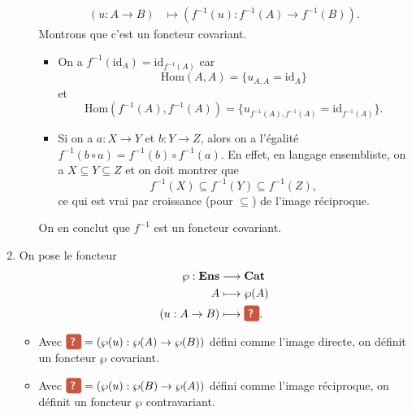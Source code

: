 \documentclass{../../td}
\begin{document}
\begin{enumerate}
\begin{itemize}
\begin{align*}
            (u: A \to B) &\longmapsto (f^{-1}(u) : f^{-1}(A) \to f^{-1}(B))
          .\end{align*}
          Montrons que c'est un foncteur covariant.
          \begin{itemize}
            \item On a $f^{-1}(\mathrm{id}_A) = \mathrm{id}_{f^{-1}(A)}$ car \[
                \mathrm{Hom}(A,A) = \{u_{A,A}=\mathrm{id}_A\}
              \]
              et
              \[
                \mathrm{Hom}(f^{-1}(A),f^{-1}(A)) = \{u_{f^{-1}(A),f^{-1}(A)} = \mathrm{id}_{f^{-1}(A)}\}.
            \]
            \item Si on a $a : X \to Y$ et $b : Y \to Z$, alors 
              on a l'égalité~$f^{-1}(b \circ a) = f^{-1}(b) \circ f^{-1}(a)$.
              En effet, en langage ensembliste, on a $X \subseteq Y\subseteq Z$ et on
              doit montrer que \[
              f^{-1}(X) \subseteq f^{-1}(Y) \subseteq f^{-1}(Z)
              ,\] ce qui est vrai par croissance (pour $\subseteq$) de l'image réciproque.
          \end{itemize}
          On en conclut que $f^{-1}$ est un foncteur covariant.
      \end{itemize}
    \item On pose le foncteur 
      \begin{align*}
        \wp: \mathbf{Ens} &\longrightarrow \mathbf{Cat} \\
        A &\longmapsto \wp(A)\\
        (u: A \to B) &\longmapsto \redQuestionBox
      .\end{align*}
      \begin{itemize}
        \item Avec $\redQuestionBox = (\wp(u) : \wp(A) \to \wp(B))$ défini comme l'image directe, on définit un foncteur $\wp$ covariant.
        \item Avec $\redQuestionBox = (\wp(u) : \wp(B) \to \wp(A))$ défini comme l'image réciproque, on définit un foncteur $\wp$ contravariant.
      \end{itemize}
  \end{enumerate}
\end{document}
